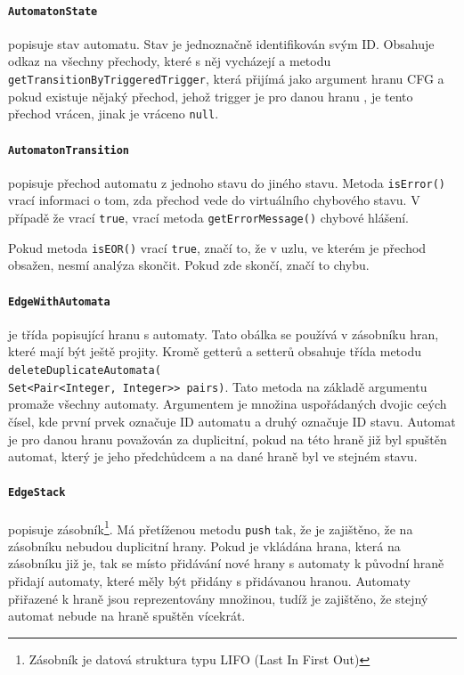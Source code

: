 \documentclass[11pt,final,oneside]{fithesis}
\begin{document}
\paragraph{\texttt{AutomatonState}} 
popisuje stav automatu. Stav je jednoznačně identifikován svým ID. Obsahuje odkaz na všechny přechody, které s něj vycházejí a metodu \texttt{getTransitionByTriggeredTrigger}, která přijímá jako argument hranu CFG a pokud existuje nějaký přechod, jehož trigger je pro danou hranu , je tento přechod vrácen, jinak je vráceno \texttt{null}.

\paragraph{\texttt{AutomatonTransition}} popisuje přechod automatu z jednoho stavu do jiného stavu. Metoda \texttt{isError()} vrací informaci o tom, zda přechod vede do virtuálního chybového stavu.  V případě že vrací \texttt{true}, vrací metoda \texttt{getErrorMessage()} chybové hlášení. 

Pokud metoda \texttt{isEOR()} vrací \texttt{true}, značí to, že v uzlu, ve kterém je přechod obsažen, nesmí analýza skončit. Pokud zde skončí, značí to chybu.

\paragraph{\texttt{EdgeWithAutomata}}
je třída popisující hranu s automaty. Tato obálka se používá v zásobníku hran, které mají být ještě projity. Kromě getterů a setterů obsahuje třída metodu \texttt{deleteDuplicateAutomata(\\ Set<Pair<Integer, Integer>> pairs)}. Tato metoda na základě argumentu promaže všechny  automaty. Argumentem je množina uspořádaných dvojic ceých čísel, kde první prvek označuje ID automatu a druhý označuje ID stavu. Automat je pro danou hranu považován za duplicitní, pokud na této hraně již byl spuštěn automat, který je jeho předchůdcem a na dané hraně byl ve stejném stavu.

\paragraph{\texttt{EdgeStack}} 
popisuje zásobník\footnote{Zásobník je datová struktura typu LIFO (Last In First Out)}. Má přetíženou metodu \texttt{push} tak, že je zajištěno, že na zásobníku nebudou duplicitní hrany. Pokud je vkládána hrana, která na zásobníku již je, tak se místo přidávání nové hrany s automaty k původní hraně přidají automaty, které měly být přidány s přidávanou hranou. Automaty přiřazené k hraně jsou reprezentovány množinou, tudíž je zajištěno, že stejný automat nebude na hraně spuštěn vícekrát.
\end{document}
